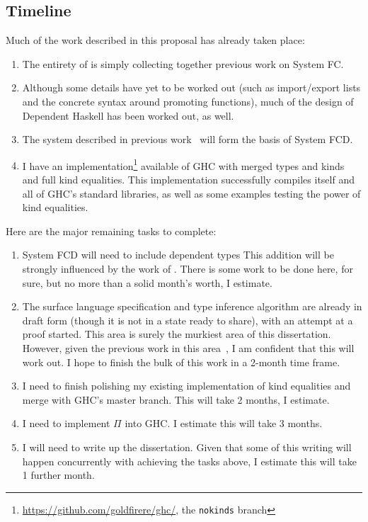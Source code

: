 \begin{proposal}

\chapter{\color{proposal}Timeline}
\label{cha:proposal}

Much of the work described in this proposal has already taken place:
\begin{enumerate}
\item The entirety of  is simply collecting together previous
work on System FC.
\item Although some details have yet to be worked out (such as import/export lists
and the concrete syntax around promoting functions), much of the design of
Dependent Haskell has been worked out, as well.
\item The system described in previous work~\cite{nokinds} will form the
basis of System FCD.
\item I have an implementation\footnote{\url{https://github.com/goldfirere/ghc/},
the \texttt{nokinds} branch} available of GHC with merged types and kinds and
full kind equalities. This implementation successfully compiles itself and all
of GHC's standard libraries, as well as some examples testing the power of
kind equalities.
\end{enumerate}

Here are the major remaining tasks to complete:
\begin{enumerate}
\item System FCD will need to include dependent types
  This addition
  will be strongly influenced by the work of \citet{gundry-thesis}.
  There is some work to be done here, for sure, but no more than a solid
  month's worth, I estimate.
\item The surface language specification and type inference algorithm are
  already in draft form (though it is not in a state ready to share), with an
  attempt at a proof started. This area is surely the murkiest area of this
  dissertation. However, given the previous work in this area~\cite{gundry-thesis},
  I am confident that this will work out. I hope to finish the bulk of this work
  in a 2-month time frame.
\item I need to finish polishing my existing implementation of kind equalities
  and merge with GHC's master branch. This will take 2 months, I estimate.
\item I need to implement $\Pi$ into GHC. I estimate this will take 3 months.
\item I will need to write up the dissertation. Given that some of this writing
  will happen concurrently with achieving the tasks above, I estimate this will
  take 1 further month.
\end{enumerate}


\end{proposal}
